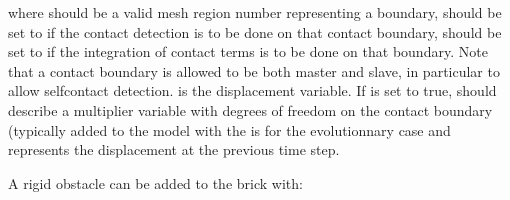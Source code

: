 \documentclass[a4paper,11pt,english]{sphinxmanual}
\begin{document}
\begin{sphinxVerbatim}[commandchars=\\\{\}]
 
          
          
             
       
\end{sphinxVerbatim}

where  should be a valid mesh region number representing a boundary,  should be set to  if the contact detection is to be done on that contact boundary,  should be set to  if the integration of contact terms is to be done on that boundary. Note that a contact boundary is allowed to be both master and slave, in particular to allow self\sphinxhyphen{}contact detection.  is the displacement variable. If  is set to true,  should describe a multiplier variable with degrees of freedom on the contact boundary (typically added to the model with the  is for the evolutionnary case and represents the displacement at the previous time step.

A rigid obstacle can be added to the brick with:

\begin{sphinxVerbatim}[commandchars=\\\{\}]
 
         
\end{sphinxVerbatim}
\end{document}
